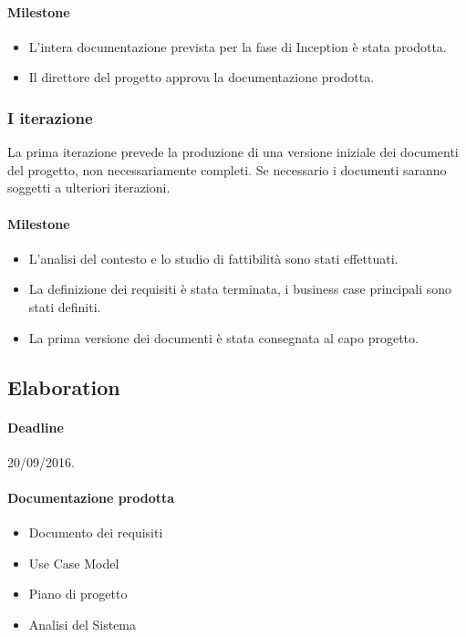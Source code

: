 \paragraph{Milestone}
\begin{itemize}
	\item L'intera documentazione prevista per la fase di Inception \`e stata prodotta.
	\item Il direttore del progetto approva la documentazione prodotta.
\end{itemize}

\subsubsection{I iterazione}

La prima iterazione prevede la produzione di una versione iniziale dei documenti del progetto, non necessariamente completi.
Se necessario i documenti saranno soggetti a ulteriori iterazioni.

\paragraph{Milestone}
\begin{itemize}
	\item L'analisi del contesto e lo studio di fattibilit\`a sono stati effettuati.
	\item La definizione dei requisiti \`e stata terminata, i business case principali sono stati definiti.
	\item La prima versione dei documenti \`e stata consegnata al capo progetto.
\end{itemize}

\subsection{Elaboration}

\paragraph{Deadline}
20/09/2016.

\paragraph{Documentazione prodotta}
\begin{itemize}
	\item Documento dei requisiti
	\item Use Case Model
	\item Piano di progetto
	\item Analisi del Sistema
\end{itemize}

